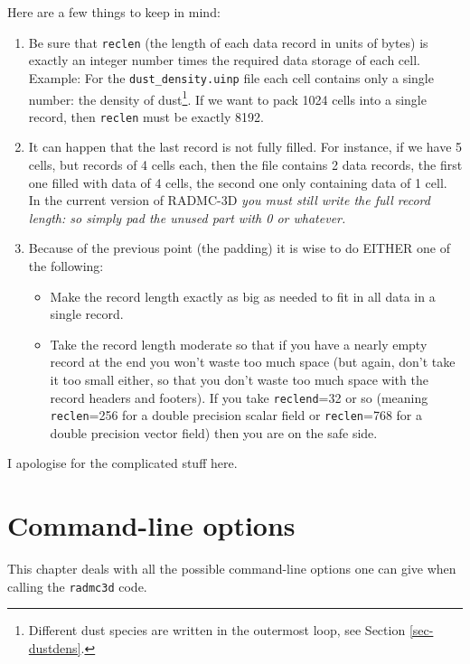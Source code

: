 \documentclass{report}
\begin{document}
Here are a few things to keep in  mind:
\begin{enumerate}
\item Be sure that {\small\tt reclen} (the length of each data record in
  units of bytes) is exactly an integer number times the required data
  storage of each cell. Example: For the {\small\tt dust\_density.uinp} file
  each cell contains only a single number: the density of
  dust\footnote{Different dust species are written in the outermost loop,
    see Section \ref{sec-dustdens}.}. If we want to pack 1024 cells into a
  single record, then {\small\tt reclen} must be exactly 8192. 
\item It can happen that the last record is not fully filled. For instance,
  if we have 5 cells, but records of 4 cells each, then the file contains
  2 data records, the first one filled with data of 4 cells, the second
  one only containing data of 1 cell. In the current version of RADMC-3D
  {\em you must still write the full record length: so simply pad the
    unused part with 0 or whatever.} 
\item Because of the previous point (the padding) it is wise to do EITHER
  one of the following:
  \begin{itemize}
  \item Make the record length exactly as big as needed to fit in all data
    in a single record.
  \item Take the record length moderate so that if you have a nearly empty
    record at the end you won't waste too much space (but again, don't take
    it too small either, so that you don't waste too much space with the
    record headers and footers). If you take {\small\tt reclend}=32 or so
    (meaning {\small\tt reclen}=256 for a double precision scalar field or
    {\small\tt reclen}=768 for a double precision vector field) then you
    are on the safe side. 
  \end{itemize}
\end{enumerate}
I apologise for the complicated stuff here. 


\chapter{Command-line options}
\label{chap-command-line-options}
%
This chapter deals with all the possible command-line options one can 
give when calling the {\small\tt radmc3d} code.
\end{document}
